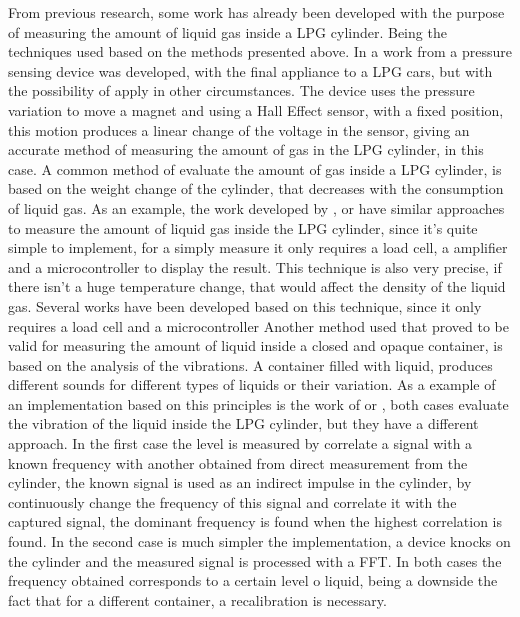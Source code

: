 From previous research, some work has already been developed with the purpose of measuring the amount of liquid gas inside a LPG cylinder. Being the techniques used based on the methods presented above.
In a work from \citeauthor{baigAccurateMeasurementPressure2008b} a pressure sensing device was developed, with the final appliance to a LPG cars, but with the possibility of apply in other circumstances. The device uses the pressure variation to move a magnet and using a Hall Effect sensor, with a fixed position, this motion produces a linear change of the voltage in the sensor, giving an accurate method of measuring the amount of gas in the LPG cylinder, in this case\cite{baigAccurateMeasurementPressure2008b}. 
A common method of evaluate the amount of gas inside a LPG cylinder, is based on the weight change of the cylinder, that decreases with the consumption of liquid gas. As an example, the work developed by \citeauthor{dasilvamedeirosSmartgasSmartPlatform2017a}, \citeauthor{shresthaIoTBasedSmart2019a} or \citeauthor{shinganSmartGasCylinder2017a} have similar approaches to measure the amount of liquid gas inside the LPG cylinder, since it's quite simple to implement, for a simply measure it only requires a load cell, a amplifier and a microcontroller to display the result. This technique is also very precise, if there isn't a huge temperature change, that would affect the density of the liquid gas\cite{dasilvamedeirosSmartgasSmartPlatform2017a}\cite{shresthaIoTBasedSmart2019a}\cite{shinganSmartGasCylinder2017a}.
Several works have been developed based on this technique, since it only requires a load cell and a microcontroller
Another method used that proved to be valid for measuring the amount of liquid inside a closed and opaque container, is based on the analysis of the vibrations. A container filled with liquid, produces different sounds for different types of liquids or their variation. As a example of an implementation based on this principles is the work of \citeauthor{jahnLevelSensorFluids2014a} or \citeauthor{wuAnalysisImplementationNoncontact2016a}, both cases evaluate the vibration of the liquid inside the LPG cylinder, but they have a different approach. In the first case the level is measured by correlate a signal with a known frequency with another obtained from direct measurement from the cylinder, the known signal is used as an indirect impulse in the cylinder, by continuously change the frequency of this signal and correlate it with the captured signal, the dominant frequency is found when the highest correlation is found. In the second case is much simpler the implementation, a device knocks on the cylinder and the measured signal is processed with a FFT. In both cases the frequency obtained corresponds to a certain level o liquid, being a downside the fact that for a different container, a recalibration is necessary\cite{jahnLevelSensorFluids2014a}\cite{wuAnalysisImplementationNoncontact2016a}. 

